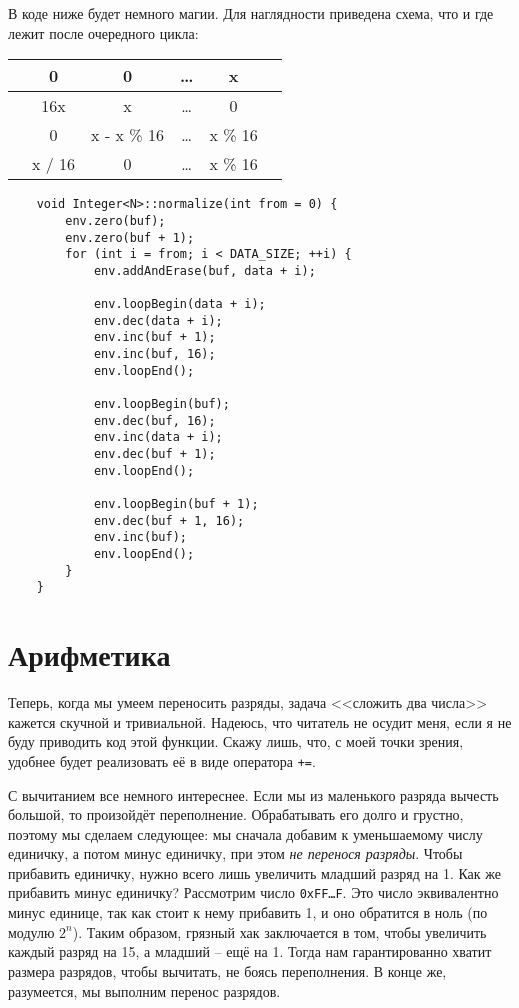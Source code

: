 \documentclass{book}
\begin{document}
В коде ниже будет немного магии. Для наглядности приведена схема, что и где лежит после очередного цикла:

\begin{tabular}{c|c|c|c|c|c}
    \hline
    & 0 & 0 & \dots & x & \\
    \hline
    \hline
    & 16x & x & \dots & 0 & \\
    \hline
    \hline
    & 0 & x - x \% 16 & \dots & x \% 16 & \\
    \hline
    \hline
    & x / 16 & 0 & \dots & x \% 16 & \\
    \hline
\end{tabular}


\begin{verbatim}
    void Integer<N>::normalize(int from = 0) {
        env.zero(buf);
        env.zero(buf + 1);
        for (int i = from; i < DATA_SIZE; ++i) {
            env.addAndErase(buf, data + i);
            
            env.loopBegin(data + i);
            env.dec(data + i);
            env.inc(buf + 1);
            env.inc(buf, 16);
            env.loopEnd();
           
            env.loopBegin(buf);
            env.dec(buf, 16);
            env.inc(data + i);
            env.dec(buf + 1);
            env.loopEnd();
          
            env.loopBegin(buf + 1);
            env.dec(buf + 1, 16);
            env.inc(buf);
            env.loopEnd();
        }
    }
\end{verbatim}

\section{Арифметика}

Теперь, когда мы умеем переносить разряды, задача <<сложить два числа>> кажется скучной и тривиальной. Надеюсь, что читатель не
осудит меня, если я не буду приводить код этой функции. Скажу лишь, что, с моей точки зрения, удобнее будет реализовать её в виде
оператора \texttt{+=}.

С вычитанием все немного интереснее. Если мы из маленького разряда вычесть большой, то произойдёт переполнение. Обрабатывать его
долго и грустно, поэтому мы сделаем следующее: мы сначала добавим к уменьшаемому числу единичку, а потом минус единичку, при этом
{\em не перенося разряды}. Чтобы прибавить единичку, нужно всего лишь увеличить младший разряд на 1. Как же прибавить минус единичку?
Рассмотрим число \texttt{0xFF\dots F}. Это число эквивалентно минус единице, так как стоит к нему прибавить 1, и оно обратится в ноль
(по модулю $2^n$). Таким образом, грязный хак заключается в том, чтобы увеличить каждый разряд на 15, а младший -- ещё на 1. Тогда
нам гарантированно хватит размера разрядов, чтобы вычитать, не боясь переполнения. В конце же, разумеется, мы выполним перенос
разрядов.
\end{document}
